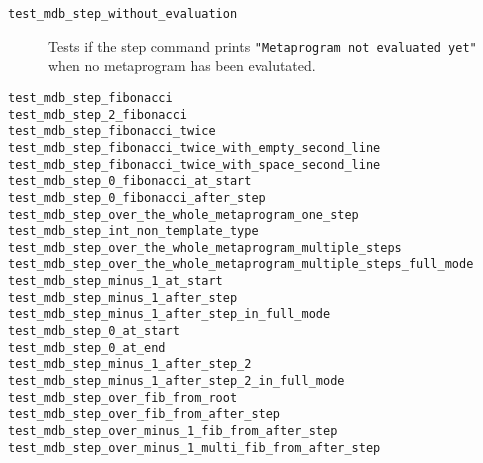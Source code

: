 \begin{description}
    \item[\texttt{test\_mdb\_step\_without\_evaluation}]
        Tests if the step command prints
        \texttt{"Metaprogram not evaluated yet"} when no metaprogram has been
        evalutated.
    \item[\texttt{test\_mdb\_step\_fibonacci}]
    \item[\texttt{test\_mdb\_step\_2\_fibonacci}]
    \item[\texttt{test\_mdb\_step\_fibonacci\_twice}]
    \item[\texttt{test\_mdb\_step\_fibonacci\_twice\_with\_empty\_second\_line}]
    \item[\texttt{test\_mdb\_step\_fibonacci\_twice\_with\_space\_second\_line}]
    \item[\texttt{test\_mdb\_step\_0\_fibonacci\_at\_start}]
    \item[\texttt{test\_mdb\_step\_0\_fibonacci\_after\_step}]
    \item[\texttt{test\_mdb\_step\_over\_the\_whole\_metaprogram\_one\_step}]
    \item[\texttt{test\_mdb\_step\_int\_non\_template\_type}]
    \item[\texttt{test\_mdb\_step\_over\_the\_whole\_metaprogram\_multiple\_steps}]
    \item[\texttt{test\_mdb\_step\_over\_the\_whole\_metaprogram\_multiple\_steps\_full\_mode}]
    \item[\texttt{test\_mdb\_step\_minus\_1\_at\_start}]
    \item[\texttt{test\_mdb\_step\_minus\_1\_after\_step}]
    \item[\texttt{test\_mdb\_step\_minus\_1\_after\_step\_in\_full\_mode}]
    \item[\texttt{test\_mdb\_step\_0\_at\_start}]
    \item[\texttt{test\_mdb\_step\_0\_at\_end}]
    \item[\texttt{test\_mdb\_step\_minus\_1\_after\_step\_2}]
    \item[\texttt{test\_mdb\_step\_minus\_1\_after\_step\_2\_in\_full\_mode}]
    \item[\texttt{test\_mdb\_step\_over\_fib\_from\_root}]
    \item[\texttt{test\_mdb\_step\_over\_fib\_from\_after\_step}]
    \item[\texttt{test\_mdb\_step\_over\_minus\_1\_fib\_from\_after\_step}]
    \item[\texttt{test\_mdb\_step\_over\_minus\_1\_multi\_fib\_from\_after\_step}]

\end{description}
